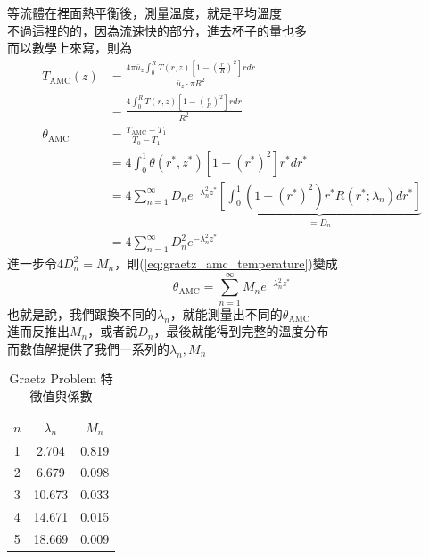 \documentclass[../main.tex]{subfiles}
\begin{document}
\begin{itemize}
\begin{enumerate}
    等流體在裡面熱平衡後，測量溫度，就是平均溫度\\
    不過這裡的的，因為流速快的部分，進去杯子的量也多\\
    而以數學上來寫，則為
    \begin{align}
      T_{\text{AMC}}(z) &= \frac{4\pi \overline u_z \int_0^R T(r,z) \left[
        1 - \left(\frac{r}{R}\right)^2
      \right] r dr}{
        \overline u_z \cdot \pi R^2
      } \nonumber\\
      &= \frac{4 \int_0^R T(r,z) \left[
        1 - \left(\frac{r}{R}\right)^2
      \right] r dr}{R^2} \nonumber\\
      \theta_{\text{AMC}} &= \frac{T_{\text{AMC}}-T_1}{T_0-T_1}\nonumber\\
       &= 4\int_0^1 \theta(r^\ast, z^\ast) \left[
        1 - (r^\ast)^2
      \right] r^\ast dr^\ast \nonumber\\
      &= 4 \sum_{n=1}^{\infty} D_n e^{-\lambda_n^2 z^\ast} \underbrace{\left[
        \int_0^1 \left(
          1 - (r^\ast)^2
        \right) r^\ast R(r^\ast; \lambda_n) dr^\ast
      \right]}_{=D_n} \nonumber\\
      &= 4 \sum_{n=1}^{\infty} D_n^2 e^{-\lambda_n^2 z^\ast} \label{eq:graetz_amc_temperature}
    \end{align}
    進一步令$4D_n^2 = M_n$，則(\ref{eq:graetz_amc_temperature})變成
    \begin{equation}
      \boxed{\theta_{\text{AMC}} = \sum_{n=1}^{\infty} M_n e^{-\lambda_n^2 z^\ast}}
    \end{equation}
    也就是說，我們跟換不同的$\lambda_n$，就能測量出不同的$\theta_{\text{AMC}}$\\
    進而反推出$M_n$，或者說$D_n$，最後就能得到完整的溫度分布\\
    而數值解提供了我們一系列的$\lambda_n,M_n$
    \begin{table}[H]
      \centering
      \begin{tabular}{c|c|c}
        $n$ & $\lambda_n$ & $M_n$ \\
        \hline
        1 & 2.704 & 0.819\\
        2 & 6.679 & 0.098\\
        3 & 10.673 & 0.033\\
        4 & 14.671 & 0.015\\
        5 & 18.669 & 0.009
      \end{tabular}
      \caption{Graetz Problem 特徵值與係數}
    \end{table}

\end{enumerate}
\end{itemize}
\end{document}
